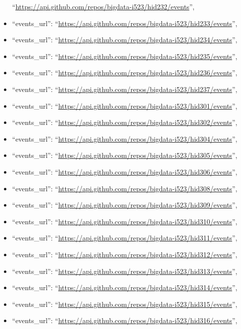 \begin{itemize}
  ``\url{https://api.github.com/repos/bigdata-i523/hid232/events}'',
\item
  ``events\_url'':
  ``\url{https://api.github.com/repos/bigdata-i523/hid233/events}'',
\item
  ``events\_url'':
  ``\url{https://api.github.com/repos/bigdata-i523/hid234/events}'',
\item
  ``events\_url'':
  ``\url{https://api.github.com/repos/bigdata-i523/hid235/events}'',
\item
  ``events\_url'':
  ``\url{https://api.github.com/repos/bigdata-i523/hid236/events}'',
\item
  ``events\_url'':
  ``\url{https://api.github.com/repos/bigdata-i523/hid237/events}'',
\item
  ``events\_url'':
  ``\url{https://api.github.com/repos/bigdata-i523/hid301/events}'',
\item
  ``events\_url'':
  ``\url{https://api.github.com/repos/bigdata-i523/hid302/events}'',
\item
  ``events\_url'':
  ``\url{https://api.github.com/repos/bigdata-i523/hid304/events}'',
\item
  ``events\_url'':
  ``\url{https://api.github.com/repos/bigdata-i523/hid305/events}'',
\item
  ``events\_url'':
  ``\url{https://api.github.com/repos/bigdata-i523/hid306/events}'',
\item
  ``events\_url'':
  ``\url{https://api.github.com/repos/bigdata-i523/hid308/events}'',
\item
  ``events\_url'':
  ``\url{https://api.github.com/repos/bigdata-i523/hid309/events}'',
\item
  ``events\_url'':
  ``\url{https://api.github.com/repos/bigdata-i523/hid310/events}'',
\item
  ``events\_url'':
  ``\url{https://api.github.com/repos/bigdata-i523/hid311/events}'',
\item
  ``events\_url'':
  ``\url{https://api.github.com/repos/bigdata-i523/hid312/events}'',
\item
  ``events\_url'':
  ``\url{https://api.github.com/repos/bigdata-i523/hid313/events}'',
\item
  ``events\_url'':
  ``\url{https://api.github.com/repos/bigdata-i523/hid314/events}'',
\item
  ``events\_url'':
  ``\url{https://api.github.com/repos/bigdata-i523/hid315/events}'',
\item
  ``events\_url'':
  ``\url{https://api.github.com/repos/bigdata-i523/hid316/events}'',

\end{itemize}
